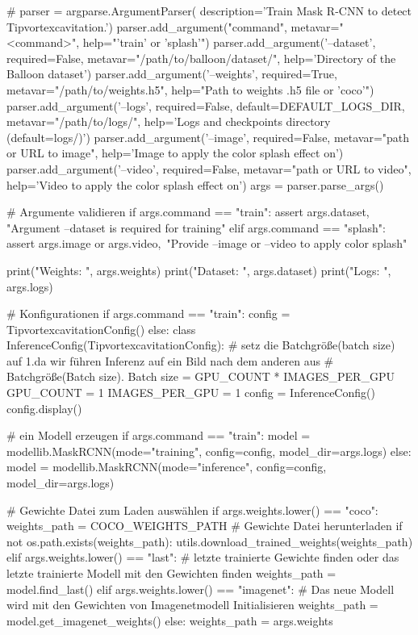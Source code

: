 {{    # 
    parser = argparse.ArgumentParser(
        description='Train Mask R-CNN to detect Tipvortexcavitation.')
    parser.add_argument("command",
                        metavar="<command>",
                        help="'train' or 'splash'")
    parser.add_argument('--dataset', required=False,
                        metavar="/path/to/balloon/dataset/",
                        help='Directory of the Balloon dataset')
    parser.add_argument('--weights', required=True,
                        metavar="/path/to/weights.h5",
                        help="Path to weights .h5 file or 'coco'")
    parser.add_argument('--logs', required=False,
                        default=DEFAULT_LOGS_DIR,
                        metavar="/path/to/logs/",
                        help='Logs and checkpoints directory (default=logs/)')
    parser.add_argument('--image', required=False,
                        metavar="path or URL to image",
                        help='Image to apply the color splash effect on')
    parser.add_argument('--video', required=False,
                        metavar="path or URL to video",
                        help='Video to apply the color splash effect on')
    args = parser.parse_args()

    # Argumente validieren
    if args.command == "train":
        assert args.dataset, "Argument --dataset is required for training"
    elif args.command == "splash":
        assert args.image or args.video,\
               "Provide --image or --video to apply color splash"

    print("Weights: ", args.weights)
    print("Dataset: ", args.dataset)
    print("Logs: ", args.logs)

    # Konfigurationen
    if args.command == "train":
        config = TipvortexcavitationConfig()
    else:
        class InferenceConfig(TipvortexcavitationConfig):
            # setz die Batchgröße(batch size) auf 1.da wir führen Inferenz auf ein Bild nach dem anderen aus 
            # Batchgröße(Batch size). Batch size = GPU_COUNT * IMAGES_PER_GPU
            GPU_COUNT = 1
            IMAGES_PER_GPU = 1
        config = InferenceConfig()
    config.display()

    # ein Modell erzeugen 
    if args.command == "train":
        model = modellib.MaskRCNN(mode="training", config=config,
                                  model_dir=args.logs)
    else:
        model = modellib.MaskRCNN(mode="inference", config=config,
                                  model_dir=args.logs)

    # Gewichte Datei zum Laden auswählen 
    if args.weights.lower() == "coco":
        weights_path = COCO_WEIGHTS_PATH
        # Gewichte Datei herunterladen
        if not os.path.exists(weights_path):
            utils.download_trained_weights(weights_path)
    elif args.weights.lower() == "last":
        # letzte trainierte Gewichte finden oder das letzte trainierte Modell mit den Gewichten finden
        weights_path = model.find_last()
    elif args.weights.lower() == "imagenet":
        # Das neue Modell wird mit den Gewichten von Imagenetmodell Initialisieren
        weights_path = model.get_imagenet_weights()
    else:
        weights_path = args.weights

}}
